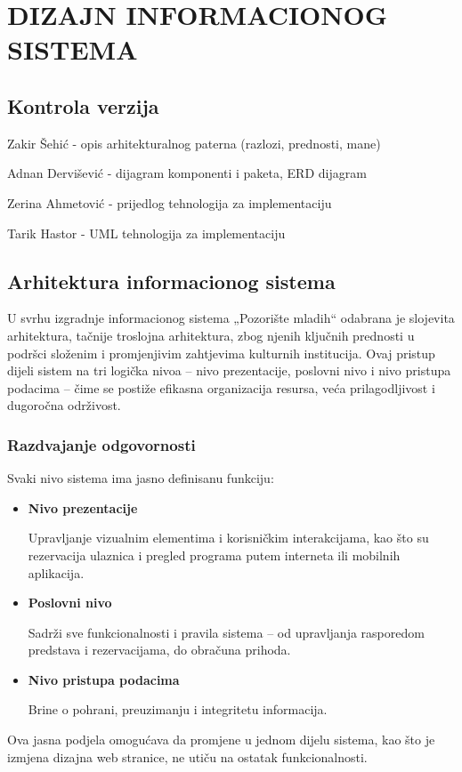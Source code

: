 \sloppy
\chapter{DIZAJN INFORMACIONOG SISTEMA}

\sloppy
\section*{Kontrola verzija}


Zakir Šehić - opis arhitekturalnog paterna (razlozi, prednosti, mane)

\noindent Adnan Dervišević - dijagram komponenti i paketa, ERD dijagram

\noindent Zerina Ahmetović - prijedlog tehnologija za implementaciju

\noindent Tarik Hastor - UML tehnologija za implementaciju

\section{Arhitektura informacionog sistema}

U svrhu izgradnje informacionog sistema „Pozorište mladih“ odabrana je slojevita arhitektura, tačnije troslojna arhitektura, zbog njenih ključnih prednosti u podršci složenim i promjenjivim zahtjevima kulturnih institucija. Ovaj pristup dijeli sistem  na tri logička nivoa – nivo prezentacije, poslovni nivo i nivo pristupa podacima – čime se postiže efikasna organizacija resursa, veća prilagodljivost i dugoročna održivost.

\subsection{Razdvajanje odgovornosti}

Svaki nivo sistema ima jasno definisanu funkciju:
\begin{itemize}[label=\textbullet]
    \item \textbf{Nivo prezentacije} 

    
    Upravljanje vizualnim elementima i korisničkim interakcijama, kao što su rezervacija ulaznica i pregled programa putem interneta ili mobilnih aplikacija.
    \item \textbf{Poslovni nivo} 

    
    Sadrži sve funkcionalnosti i pravila sistema – od upravljanja rasporedom predstava i rezervacijama, do obračuna prihoda.
    \item \textbf{Nivo pristupa podacima} 

    
    Brine o pohrani, preuzimanju i integritetu informacija.
\end{itemize}
Ova jasna podjela omogućava da promjene u jednom dijelu sistema, kao što je izmjena dizajna web stranice, ne utiču na ostatak funkcionalnosti.

